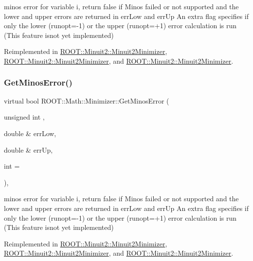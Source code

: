 minos error for variable i, return false if Minos failed or not supported and the lower and upper errors are returned in err\+Low and err\+Up An extra flag specifies if only the lower (runopt=-\/1) or the upper (runopt=+1) error calculation is run (This feature isnot yet implemented) 

Reimplemented in \mbox{\hyperlink{classROOT_1_1Minuit2_1_1Minuit2Minimizer_ab6c27c6f165821774dd304561e8956f5}{R\+O\+O\+T\+::\+Minuit2\+::\+Minuit2\+Minimizer}}, \mbox{\hyperlink{classROOT_1_1Minuit2_1_1Minuit2Minimizer_ab6c27c6f165821774dd304561e8956f5}{R\+O\+O\+T\+::\+Minuit2\+::\+Minuit2\+Minimizer}}, and \mbox{\hyperlink{classROOT_1_1Minuit2_1_1Minuit2Minimizer_ab6c27c6f165821774dd304561e8956f5}{R\+O\+O\+T\+::\+Minuit2\+::\+Minuit2\+Minimizer}}.

\mbox{\label{classROOT_1_1Math_1_1Minimizer_aeaef75b766eff7088939259c842ab056}} 
\subsubsection{\texorpdfstring{GetMinosError()}{GetMinosError()}\hspace{0.1cm}{\footnotesize\ttfamily [3/3]}}
{\footnotesize\ttfamily virtual bool R\+O\+O\+T\+::\+Math\+::\+Minimizer\+::\+Get\+Minos\+Error (\begin{DoxyParamCaption}\item[{unsigned int}]{,  }\item[{double \&}]{err\+Low,  }\item[{double \&}]{err\+Up,  }\item[{int}]{ = {} }\end{DoxyParamCaption})\hspace{0.3cm}{\ttfamily [inline]}, {\ttfamily [virtual]}}

minos error for variable i, return false if Minos failed or not supported and the lower and upper errors are returned in err\+Low and err\+Up An extra flag specifies if only the lower (runopt=-\/1) or the upper (runopt=+1) error calculation is run (This feature isnot yet implemented) 

Reimplemented in \mbox{\hyperlink{classROOT_1_1Minuit2_1_1Minuit2Minimizer_ab6c27c6f165821774dd304561e8956f5}{R\+O\+O\+T\+::\+Minuit2\+::\+Minuit2\+Minimizer}}, \mbox{\hyperlink{classROOT_1_1Minuit2_1_1Minuit2Minimizer_ab6c27c6f165821774dd304561e8956f5}{R\+O\+O\+T\+::\+Minuit2\+::\+Minuit2\+Minimizer}}, and \mbox{\hyperlink{classROOT_1_1Minuit2_1_1Minuit2Minimizer_ab6c27c6f165821774dd304561e8956f5}{R\+O\+O\+T\+::\+Minuit2\+::\+Minuit2\+Minimizer}}.

